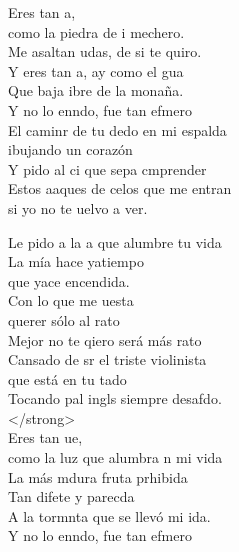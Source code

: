 \begin{cancion}%
	Eres tan a, \\
	como la piedra de i mechero.\\
	Me asaltan udas, de si te quiro.\\
	Y eres tan a, ay como el gua\\
	Que baja ibre de la monaña.\\
	\jump
	Y no lo enndo, fue tan efmero\\
	El caminr de tu dedo en mi espalda \\
	ibujando un corazón\\
	Y pido al ci que sepa cmprender\\
	Estos aaques de celos que me entran\\
	si yo no te uelvo a ver.\jump\\
	\begin{chorus}%
		Le pido a la a que alumbre tu vida\\
		La mía hace yatiempo \\
	\jump
	que yace encendida.\\
		Con lo que me uesta \\
	\jump
	querer sólo al rato\\
		Mejor no te qiero será más rato\\
		Cansado de sr el triste violinista \\
		que está en tu tado \\
		Tocando pal ingls siempre desafdo.\\
	 </strong>\\
		Eres tan ue, \\
		como la luz que alumbra n mi vida\\
		La más mdura fruta prhibida\\
		Tan difete y parecda\\
		A la tormnta que se llevó mi ida.\\
	\jump
		Y no lo enndo, fue tan efmero\\

\end{chorus}
\end{cancion}
